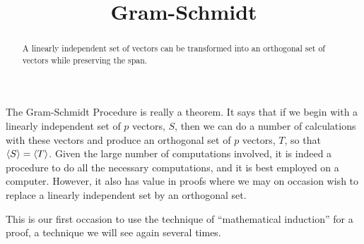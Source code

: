 \documentclass{ximera}
\title{Gram-Schmidt}
\begin{document}
\begin{abstract}
  A linearly independent set of vectors can be transformed into an
  orthogonal set of vectors while preserving the span.
\end{abstract}
\maketitle

The Gram-Schmidt Procedure is really a theorem.  It says that if we
begin with a linearly independent set of $p$ vectors, $S$, then we can
do a number of calculations with these vectors and produce an
orthogonal set of $p$ vectors, $T$, so that $\left\langle S\right\rangle=\left\langle T\right\rangle$.  Given
the large number of computations involved, it is indeed a procedure to
do all the necessary computations, and it is best employed on a
computer.  However, it also has value in proofs where we may on
occasion wish to replace a linearly independent set by an orthogonal
set.

This is our first occasion to use the technique of ``mathematical
induction'' for a proof, a technique we will see again several times.
\end{document}
